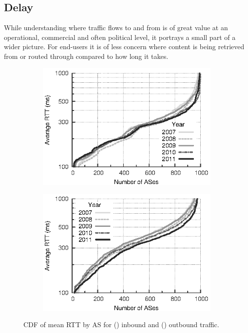 \subsection{Delay}
\label{section:malawi:delay}
 
While understanding where traffic flows to and from is of great value at an operational, commercial and often political level, it portrays a small part of a wider picture. 
For end-users it is of less concern where content is being retrieved from or routed through compared to how long it takes.

\begin{figure}
    \centering
    \begin{subfigure}[b]{0.5\linewidth}
        \includegraphics{figures/malawi/rtt_cdf_in}
        \caption{\label{fig:rtt_cdf_in}}
    \end{subfigure}%
    \begin{subfigure}[b]{0.5\linewidth}
        \includegraphics{figures/malawi/rtt_cdf_out}
        \caption{\label{fig:rtt_cdf_out}}
    \end{subfigure}%
    \caption[\acs{CDF} of mean \acs{RTT} by \acs{AS}]{\acs{CDF} of mean \acs{RTT} by \acs{AS} for () inbound and () outbound traffic. \label{fig:rtt_cdf}}
\end{figure}


